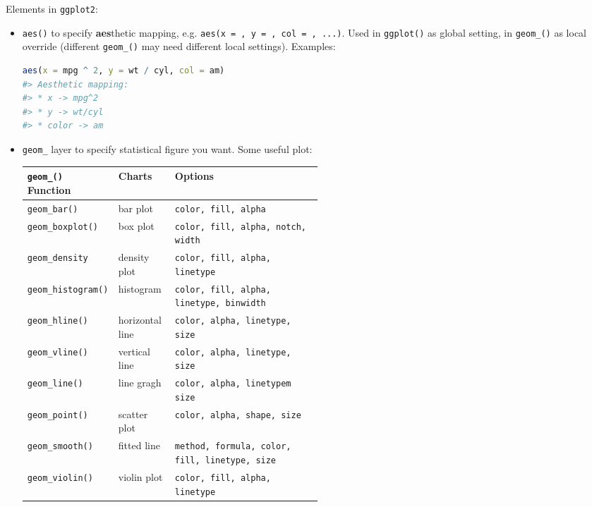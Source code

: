     Elements in \lstinline|ggplot2|:
    \begin{itemize}[topsep=2pt,itemsep=0pt]
        \item \lstinline|aes()| to specify \textbf{aes}thetic mapping, e.g. \lstinline|aes(x = , y = , col = , ...)|. Used in \lstinline|ggplot()| as global setting, in \lstinline|geom_()| as local override (different \lstinline|geom_()| may need different local settings). Examples:
\begin{lstlisting}[language=R]
aes(x = mpg ^ 2, y = wt / cyl, col = am)
#> Aesthetic mapping: 
#> * x -> mpg^2
#> * y -> wt/cyl
#> * color -> am
\end{lstlisting}

        \item \lstinline|geom_| layer to specify statistical figure you want. Some useful plot:
\begin{table}[H]
    \centering
    \renewcommand\arraystretch{1.15}
    \begin{tabularx}{0.9\linewidth}{XXp{0.5\linewidth}}
        \hline
        \hline
        \lstinline|geom_()| Function    &Charts         &Options\\
        \hline
        \lstinline|geom_bar()|          &bar plot       &\lstinline|color, fill, alpha|\\
        \lstinline|geom_boxplot()|      &box plot       &\lstinline|color, fill, alpha, notch, width|\\
        \lstinline|geom_density|        &density plot   &\lstinline|color, fill, alpha, linetype|\\
        \lstinline|geom_histogram()|    &histogram      &\lstinline|color, fill, alpha, linetype, binwidth|\\
        \lstinline|geom_hline()|        &horizontal line            &\lstinline|color, alpha, linetype, size|\\
        \lstinline|geom_vline()|        &vertical line            &\lstinline|color, alpha, linetype, size|\\
        \lstinline|geom_line()|         &line gragh     &\lstinline|color, alpha, linetypem size|\\
        \lstinline|geom_point()|        &scatter plot       &\lstinline|color, alpha, shape, size|\\
        \lstinline|geom_smooth()|       &fitted line        &\lstinline|method, formula, color, fill, linetype, size|\\
        \lstinline|geom_violin()|       &violin plot        &\lstinline|color, fill, alpha, linetype|\\

\end{tabularx}
\end{table}
\end{itemize}
